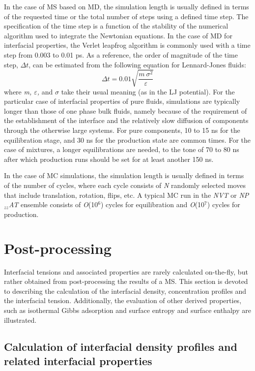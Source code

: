 \documentclass[9pt,bestpractices]{livecoms}
\begin{document}
In the case of MS based on MD, the simulation length is usually defined in
terms of the requested time or the total number of steps using a defined time
step. The specification of the time step is a function of the stability of the
numerical algorithm used to integrate the Newtonian equations. In the case of
MD for interfacial properties, the Verlet leapfrog algorithm is commonly used
with a time step from 0.003 to 0.01 ps. As a reference, the order of magnitude 
of the time step, $\Delta t$, can be estimated from the following equation
for Lennard-Jones fluids:
\begin{equation}
\Delta t=0.01\sqrt{\frac{m\:\sigma^{2}}{\varepsilon}}
\end{equation}
where \textit{m, ${\varepsilon}$,} and ${\sigma}$  take their usual meaning (as
in the LJ potential). For the particular case of interfacial properties of pure
fluids, simulations are typically longer than those of one phase bulk fluids,
namely because of the requirement of the establishment of the interface and the
relatively slow diffusion of components through the otherwise large systems.
For pure components, 10 to 15 ns for the equilibration stage, and 30 ns for the
production state are common times. For the case of mixtures, a longer
equilibrations are needed, to the tone of 70 to 80 ns after which production
runs should be set for at least another 150 ns.

In the case of MC simulations, the simulation length is usually defined in
terms of the number of cycles, where each cycle consists of \textit{N} randomly
selected moves that include translation, rotation, flips, etc. A typical MC run
in the \textit{NVT} or \textit{NP}$_{zz}$\textit{AT} ensemble consists of
\textit{O}(10$^{6}$) cycles for equilibration and \textit{O}(10$^{7}$) cycles
for production.

\section{Post-processing}

Interfacial tensions and associated properties are rarely calculated
on-the-fly, but rather obtained from post-processing the results of a MS. This
section is devoted to describing the calculation of the interfacial density,
concentration profiles and the interfacial tension. Additionally, the evaluation
of other derived
properties, such as isothermal Gibbs adsorption and surface entropy and surface
enthalpy are illustrated. 

\subsection{Calculation of interfacial density profiles and related interfacial properties}
\end{document}
